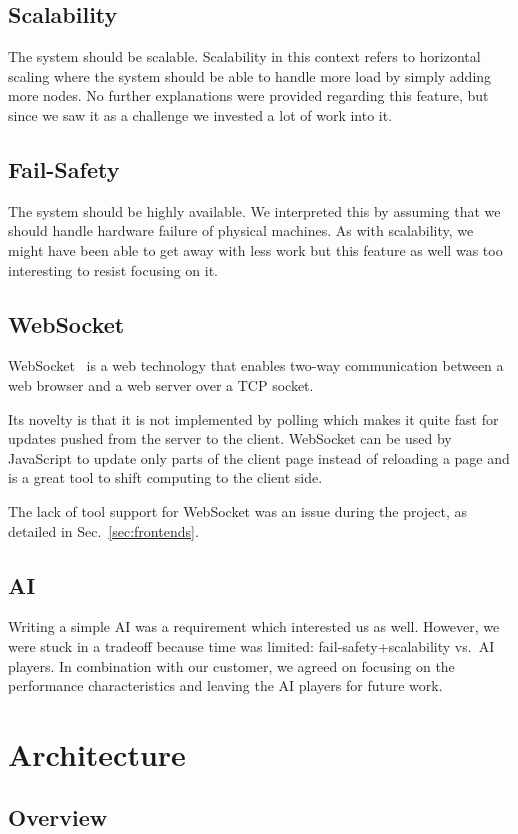 \documentclass[11pt,a4paper]{report}
\begin{document}
\subsection{Scalability}
The system should be scalable. Scalability in this context refers to horizontal
scaling where the system should be able to handle more load by simply adding
more nodes. No further explanations were provided regarding this feature, but
since we saw it as a challenge we invested a lot of work into it.

\subsection{Fail-Safety}
The system should be highly available. We interpreted this by assuming that we
should handle hardware failure of physical machines. As with scalability, we
might have been able to get away with less work but this feature as well was
too interesting to resist focusing on it.

\subsection{WebSocket}
WebSocket~\cite{websocket} is a web technology that enables two-way
communication between a web browser and a web server over a TCP socket.

Its novelty is that it is not implemented by polling which makes it quite
fast for updates pushed from the server to the client.
WebSocket can be used by JavaScript to update only parts of the client page
instead of reloading a page and is a great tool to shift computing to the
client side.

The lack of tool support for WebSocket was an issue during the project, as
detailed in Sec.~\ref{sec:frontends}.

\subsection{AI}
Writing a simple AI was a requirement which interested us as well. However, we
were stuck in a tradeoff because time was limited: fail-safety+scalability
vs.\ AI players. In combination with our customer, we agreed on focusing on the
performance characteristics and leaving the AI players for future work.

\section{Architecture}
\subsection{Overview}
\end{document}
